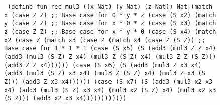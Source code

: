 \begin{figure}
  \texttt{
    (define-fun-rec mul3 ((x Nat) (y Nat) (z Nat)) Nat
      (match x
        (case Z Z)                    ;; Base case for 0 * y * z
        (case (S x2)
          (match y
            (case Z Z)                ;; Base case for x * 0 * z
            (case (S x3)
              (match z
                (case Z Z)            ;; Base case for x * y * 0
                (case (S x4)
                  (match x2
                    (case Z
                      (match x3
                        (case Z
                          (match x4
                            (case Z
                              (S Z))  ;; Base case for 1 * 1 * 1
                            (case (S x5)
                              (S (add3 (mul3 Z Z x4)
                                       (add3 (mul3 (S Z) Z x4)
                                             (mul3 Z (S Z) x4)
                                             (mul3 Z Z (S Z)))
                                       (add3 Z Z x4))))))
                        (case (S x6)
                          (S (add3 (mul3 Z x3 x4)
                                   (add3 (mul3 (S Z) x3 x4)
                                         (mul3 Z (S Z) x4)
                                         (mul3 Z x3 (S Z)))
                                   (add3 Z x3 x4))))))
                    (case (S x7)
                      (S (add3 (mul3 x2 x3 x4)
                               (add3 (mul3 (S Z) x3 x4)
                                     (mul3 x2 (S Z) x4)
                                     (mul3 x2 x3 (S Z)))
                               (add3 x2 x3 x4))))))))))))
  }
  \label{fig:faildefs}
\end{figure}
